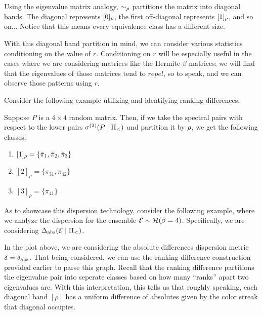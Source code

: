 \begin{remark}
Using the eigenvalue matrix analogy, $\sim_{\rho}$ partitions the matrix into diagonal bands.
The diagonal represents $[0]_{\rho}$, the first off-diagonal represents $[1]_{\rho}$, and so on...
Notice that this means every equivalence class has a different size.
\end{remark}

\newpage

 With this diagonal band partition in mind, we can consider various statistics conditioning on the value of $r$.
Conditioning on $r$ will be especially useful in the cases where we are considering matrices like the Hermite-$\beta$ matrices;
we will find that the eigenvalues of those matrices tend to $\textit{repel}$, so to speak, and we can observe those patterns using $r$. \newline

\noindent Consider the following example utilizing and identifying ranking differences.

\begin{example}
Suppose $P$ is a $4 \times 4$ random matrix. Then, if we take the spectral pairs with respect to the lower pairs ${\sigma^{(2)}}(P \mid \Pi_<)$ and partition it by ${\rho}$,
we get the following classes:
\begin{enumerate}
  \item $[1]_\rho = \{{\tilde{\pi}}_1, {\tilde{\pi}}_2, {\tilde{\pi}}_3\}$
  \item $[2]_\rho = \{\pi_{31}, \pi_{42}\}$
  \item $[3]_\rho = \{\pi_{41}\}$
\end{enumerate}
\end{example}

\newpage


As to showcase this dispersion technology, consider the following example, where we analyze the dispersion for the ensemble $\mathcal{E} \sim \mathcal{H}(\beta = 4)$.
Specifically, we are considering $\Delta_{\text{abs}}(\mathcal{E} \mid \Pi_<)$.



In the plot above, we are considering the absolute differences dispersion metric $\delta = \delta_{\text{abs}}$.
That being considered, we can use the ranking difference construction provided earlier to parse this graph.
Recall that the ranking difference partitions the eigenvalue pair into seperate classes based on how many ``ranks'' apart two eigenvalues are.
With this interpretation, this tells us that roughly speaking, each diagonal band $[\rho]$ has a uniform difference of absolutes given by the color streak
that diagonal occupies.

